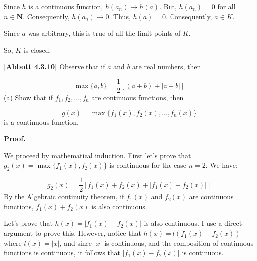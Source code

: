\documentclass[10pt]{article}
\begin{document}
Since $\displaystyle h$ is a continuous function, $\displaystyle h( a_{n})\rightarrow h( a)$. But, $\displaystyle h( a_{n}) =0$ for all $\displaystyle n\in \mathbf{N}$. Consequently, $\displaystyle h( a_{n})\rightarrow 0$. Thus, $\displaystyle h( a) =0$. Consequently, $\displaystyle a\in K$.



Since $\displaystyle a$ was arbitrary, this is true of all the limit points of $\displaystyle K$.



So, $\displaystyle K$ is closed.



\textbf{[Abbott 4.3.10]} Observe that if $\displaystyle a$ and $\displaystyle b$ are real numbers, then


\begin{equation*}
\max\{a,b\} =\frac{1}{2}[( a+b) +|a-b|]
\end{equation*}
(a) Show that if $\displaystyle f_{1} ,f_{2} ,\dotsc ,f_{n}$ are continuous functions, then


\begin{equation*}
g( x) =\max\{f_{1}( x) ,f_{2}( x) ,\dotsc ,f_{n}( x)\}
\end{equation*}
is a continuous function.



\textbf{Proof.}



We proceed by mathematical induction. First let's prove that $\displaystyle g_{2}( x) =\max\{f_{1}( x) ,f_{2}( x)\}$ is continuous for the case $\displaystyle n=2$. We have:


\begin{equation*}
g_{2}( x) =\frac{1}{2}[ f_{1}( x) +f_{2}( x) +|f_{1}( x) -f_{2}( x) |]
\end{equation*}
By the Algebraic continuity theorem, if $\displaystyle f_{1}( x)$ and $\displaystyle f_{2}( x)$ are continuous functions, $\displaystyle f_{1}( x) +f_{2}( x)$ is also continuous. 



Let's prove that $\displaystyle h( x) =|f_{1}( x) -f_{2}( x) |$ is also continuous. I use a direct argument to prove this. However, notice that $\displaystyle h( x) =l( f_{1}( x) -f_{2}( x))$ where $\displaystyle l( x) =|x|$, and since $\displaystyle |x|$ is continuous, and the composition of continuous functions is continuous, it follows that $\displaystyle |f_{1}( x) -f_{2}( x) |$ is continuous.
\end{document}
